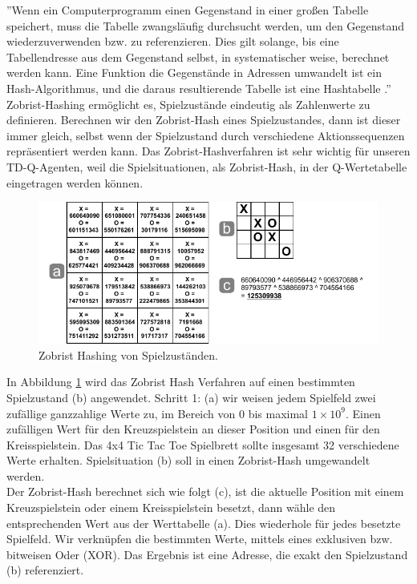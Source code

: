 ''Wenn ein Computerprogramm einen Gegenstand in einer großen Tabelle speichert, muss die Tabelle zwangsläufig durchsucht werden, um den Gegenstand wiederzuverwenden bzw. zu referenzieren. Dies gilt solange, bis eine Tabellendresse aus dem Gegenstand selbst, in systematischer weise, berechnet werden kann. Eine Funktion die Gegenstände in Adressen umwandelt ist ein Hash-Algorithmus, und die daraus resultierende Tabelle ist eine Hashtabelle \cite[3]{Zobrist}.'' \\

Zobrist-Hashing ermöglicht es, Spielzustände eindeutig als Zahlenwerte zu definieren. Berechnen wir den Zobrist-Hash eines Spielzustandes, dann ist dieser immer gleich, selbst wenn der Spielzustand durch verschiedene Aktionssequenzen repräsentiert werden kann. Das Zobrist-Hashverfahren ist sehr wichtig für unseren TD-Q-Agenten, weil die Spielsituationen, als Zobrist-Hash, in der Q-Wertetabelle eingetragen werden können.

\begin{figure}[!htbp]
  \centering
  \includegraphics[scale = 1.3]{inhalt/abbildungen/zobrist_hash_tictactoe.pdf}
  \caption{Zobrist Hashing von Spielzuständen.}
  \label{fig:zobrist_hash_tictactoe}
\end{figure} 


In Abbildung \ref{fig:zobrist_hash_tictactoe} wird das Zobrist Hash Verfahren auf einen bestimmten Spielzustand (b) angewendet. Schritt 1: (a) wir weisen jedem Spielfeld zwei zufällige ganzzahlige Werte zu, im Bereich von 0 bis maximal $1 \times 10^{9}$. Einen zufälligen Wert für den Kreuzspielstein an dieser Position und einen für den Kreisspielstein. Das 4x4 Tic Tac Toe Spielbrett sollte insgesamt 32 verschiedene Werte erhalten. Spielsituation (b) soll in einen Zobrist-Hash umgewandelt werden. \\

Der Zobrist-Hash berechnet sich wie folgt (c), ist die aktuelle Position mit einem Kreuzspielstein oder einem Kreisspielstein besetzt, dann wähle den entsprechenden Wert aus der Werttabelle (a). Dies wiederhole für jedes besetzte Spielfeld. Wir verknüpfen die bestimmten Werte, mittels eines exklusiven bzw. bitweisen Oder (XOR). Das Ergebnis ist eine Adresse, die exakt den Spielzustand (b) referenziert. \\


